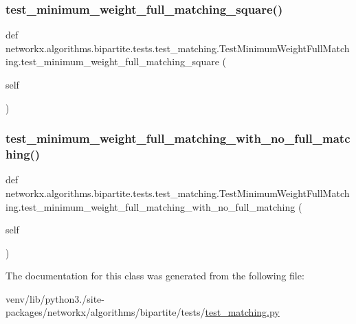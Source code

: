 \subsubsection{\texorpdfstring{test\+\_\+minimum\+\_\+weight\+\_\+full\+\_\+matching\+\_\+square()}{test\_minimum\_weight\_full\_matching\_square()}}
{\footnotesize\ttfamily def networkx.\+algorithms.\+bipartite.\+tests.\+test\+\_\+matching.\+Test\+Minimum\+Weight\+Full\+Matching.\+test\+\_\+minimum\+\_\+weight\+\_\+full\+\_\+matching\+\_\+square (\begin{DoxyParamCaption}\item[{}]{self }\end{DoxyParamCaption})}

\mbox{\label{classnetworkx_1_1algorithms_1_1bipartite_1_1tests_1_1test__matching_1_1TestMinimumWeightFullMatching_af6a7bebeec255cd8358206cc069f568c}} 
\subsubsection{\texorpdfstring{test\+\_\+minimum\+\_\+weight\+\_\+full\+\_\+matching\+\_\+with\+\_\+no\+\_\+full\+\_\+matching()}{test\_minimum\_weight\_full\_matching\_with\_no\_full\_matching()}}
{\footnotesize\ttfamily def networkx.\+algorithms.\+bipartite.\+tests.\+test\+\_\+matching.\+Test\+Minimum\+Weight\+Full\+Matching.\+test\+\_\+minimum\+\_\+weight\+\_\+full\+\_\+matching\+\_\+with\+\_\+no\+\_\+full\+\_\+matching (\begin{DoxyParamCaption}\item[{}]{self }\end{DoxyParamCaption})}



The documentation for this class was generated from the following file\+:\begin{DoxyCompactItemize}
\item 
venv/lib/python3./site-\/packages/networkx/algorithms/bipartite/tests/\hyperlink{bipartite_2tests_2test__matching_8py}{test\+\_\+matching.\+py}\end{DoxyCompactItemize}
